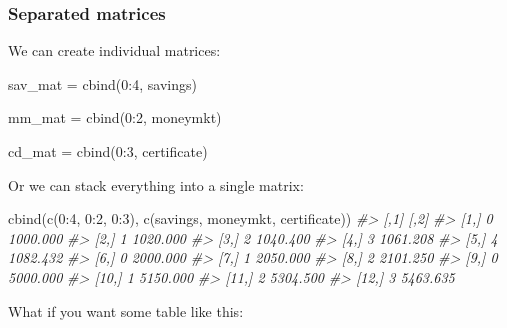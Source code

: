 \documentclass[
]{book}
\newenvironment{Shaded}{\begin{snugshade}}{\end{snugshade}}
\newcommand{\CommentTok}[1]{\textcolor[rgb]{0.56,0.35,0.01}{\textit{#1}}}
\newcommand{\DecValTok}[1]{\textcolor[rgb]{0.00,0.00,0.81}{#1}}
\newcommand{\FunctionTok}[1]{\textcolor[rgb]{0.00,0.00,0.00}{#1}}
\newcommand{\NormalTok}[1]{#1}
\newcommand{\OtherTok}[1]{\textcolor[rgb]{0.56,0.35,0.01}{#1}}
\newcommand{\SpecialCharTok}[1]{\textcolor[rgb]{0.00,0.00,0.00}{#1}}
\begin{document}
\hypertarget{separated-matrices}{%
\subsubsection*{Separated matrices}\label{separated-matrices}}

We can create individual matrices:

\begin{Shaded}
\begin{Highlighting}[]
\NormalTok{sav\_mat }\OtherTok{=} \FunctionTok{cbind}\NormalTok{(}\DecValTok{0}\SpecialCharTok{:}\DecValTok{4}\NormalTok{, savings)}

\NormalTok{mm\_mat }\OtherTok{=} \FunctionTok{cbind}\NormalTok{(}\DecValTok{0}\SpecialCharTok{:}\DecValTok{2}\NormalTok{, moneymkt)}

\NormalTok{cd\_mat }\OtherTok{=} \FunctionTok{cbind}\NormalTok{(}\DecValTok{0}\SpecialCharTok{:}\DecValTok{3}\NormalTok{, certificate)}
\end{Highlighting}
\end{Shaded}

Or we can stack everything into a single matrix:

\begin{Shaded}
\begin{Highlighting}[]
\FunctionTok{cbind}\NormalTok{(}\FunctionTok{c}\NormalTok{(}\DecValTok{0}\SpecialCharTok{:}\DecValTok{4}\NormalTok{, }\DecValTok{0}\SpecialCharTok{:}\DecValTok{2}\NormalTok{, }\DecValTok{0}\SpecialCharTok{:}\DecValTok{3}\NormalTok{), }\FunctionTok{c}\NormalTok{(savings, moneymkt, certificate))}
\CommentTok{\#\textgreater{}       [,1]     [,2]}
\CommentTok{\#\textgreater{}  [1,]    0 1000.000}
\CommentTok{\#\textgreater{}  [2,]    1 1020.000}
\CommentTok{\#\textgreater{}  [3,]    2 1040.400}
\CommentTok{\#\textgreater{}  [4,]    3 1061.208}
\CommentTok{\#\textgreater{}  [5,]    4 1082.432}
\CommentTok{\#\textgreater{}  [6,]    0 2000.000}
\CommentTok{\#\textgreater{}  [7,]    1 2050.000}
\CommentTok{\#\textgreater{}  [8,]    2 2101.250}
\CommentTok{\#\textgreater{}  [9,]    0 5000.000}
\CommentTok{\#\textgreater{} [10,]    1 5150.000}
\CommentTok{\#\textgreater{} [11,]    2 5304.500}
\CommentTok{\#\textgreater{} [12,]    3 5463.635}
\end{Highlighting}
\end{Shaded}

What if you want some table like this:
\end{document}
